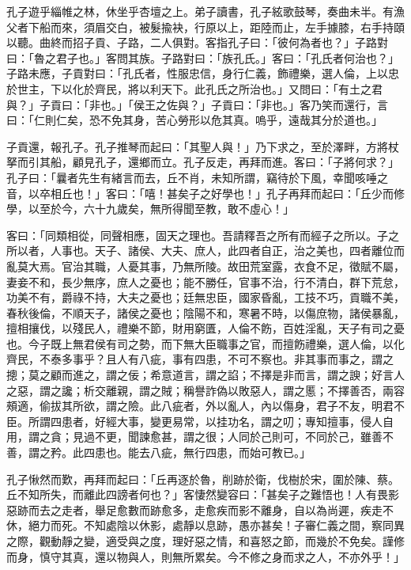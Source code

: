 
\begin{pinyinscope}
孔子遊乎緇帷之林，休坐乎杏壇之上。弟子讀書，孔子絃歌鼓琴，奏曲未半。有漁父者下船而來，須眉交白，被髮揄袂，行原以上，距陸而止，左手據膝，右手持頤以聽。曲終而招子貢、子路，二人俱對。客指孔子曰：「彼何為者也？」子路對曰：「魯之君子也。」客問其族。子路對曰：「族孔氏。」客曰：「孔氏者何治也？」子路未應，子貢對曰：「孔氏者，性服忠信，身行仁義，飾禮樂，選人倫，上以忠於世主，下以化於齊民，將以利天下。此孔氏之所治也。」又問曰：「有土之君與？」子貢曰：「非也。」「侯王之佐與？」子貢曰：「非也。」客乃笑而還行，言曰：「仁則仁矣，恐不免其身，苦心勞形以危其真。嗚乎，遠哉其分於道也。」

子貢還，報孔子。孔子推琴而起曰：「其聖人與！」乃下求之，至於澤畔，方將杖拏而引其船，顧見孔子，還鄉而立。孔子反走，再拜而進。客曰：「子將何求？」孔子曰：「曩者先生有緒言而去，丘不肖，未知所謂，竊待於下風，幸聞咳唾之音，以卒相丘也！」客曰：「嘻！甚矣子之好學也！」孔子再拜而起曰：「丘少而修學，以至於今，六十九歲矣，無所得聞至教，敢不虛心！」

客曰：「同類相從，同聲相應，固天之理也。吾請釋吾之所有而經子之所以。子之所以者，人事也。天子、諸侯、大夫、庶人，此四者自正，治之美也，四者離位而亂莫大焉。官治其職，人憂其事，乃無所陵。故田荒室露，衣食不足，徵賦不屬，妻妾不和，長少無序，庶人之憂也；能不勝任，官事不治，行不清白，群下荒怠，功美不有，爵祿不持，大夫之憂也；廷無忠臣，國家昏亂，工技不巧，貢職不美，春秋後倫，不順天子，諸侯之憂也；陰陽不和，寒暑不時，以傷庶物，諸侯暴亂，擅相攘伐，以殘民人，禮樂不節，財用窮匱，人倫不飭，百姓淫亂，天子有司之憂也。今子既上無君侯有司之勢，而下無大臣職事之官，而擅飭禮樂，選人倫，以化齊民，不泰多事乎？且人有八疵，事有四患，不可不察也。非其事而事之，謂之摠；莫之顧而進之，謂之佞；希意道言，謂之諂；不擇是非而言，謂之諛；好言人之惡，謂之讒；析交離親，謂之賊；稱譽詐偽以敗惡人，謂之慝；不擇善否，兩容頰適，偷拔其所欲，謂之險。此八疵者，外以亂人，內以傷身，君子不友，明君不臣。所謂四患者，好經大事，變更易常，以挂功名，謂之叨；專知擅事，侵人自用，謂之貪；見過不更，聞諫愈甚，謂之很；人同於己則可，不同於己，雖善不善，謂之矜。此四患也。能去八疵，無行四患，而始可教已。」

孔子愀然而歎，再拜而起曰：「丘再逐於魯，削跡於衛，伐樹於宋，圍於陳、蔡。丘不知所失，而離此四謗者何也？」客悽然變容曰：「甚矣子之難悟也！人有畏影惡跡而去之走者，舉足愈數而跡愈多，走愈疾而影不離身，自以為尚遲，疾走不休，絕力而死。不知處陰以休影，處靜以息跡，愚亦甚矣！子審仁義之間，察同異之際，觀動靜之變，適受與之度，理好惡之情，和喜怒之節，而幾於不免矣。謹修而身，慎守其真，還以物與人，則無所累矣。今不修之身而求之人，不亦外乎！」


\end{pinyinscope}
